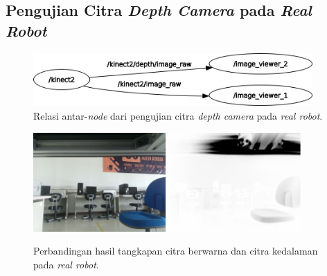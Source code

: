 \subsection{Pengujian Citra \emph{Depth Camera} pada \emph{Real Robot}}
\label{subsec:citradepthrobot}

\begin{figure}[ht]
  \centering
  \includegraphics[width=0.95\textwidth,keepaspectratio]{gambar/rosgraph-depth-camera.png}
  \caption{Relasi antar-\emph{node} dari pengujian citra \emph{depth camera} pada \emph{real robot}.}
  \label{fig:rosgraphdepthcamera}
\end{figure}


\begin{figure}[ht]
  \centering
  \includegraphics[width=0.45\textwidth,keepaspectratio]{gambar/citra-depth-camera-rgb-robot.png}
  \includegraphics[width=0.45\textwidth,keepaspectratio]{gambar/citra-depth-camera-depth-robot.png}
  \caption{Perbandingan hasil tangkapan citra berwarna dan citra kedalaman pada \emph{real robot}.}
  \label{fig:depthcamerarobot}
\end{figure}

